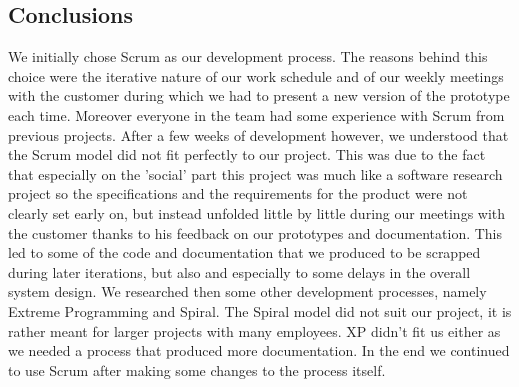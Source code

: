 \subsection{Conclusions}
We initially chose Scrum as our development process. The reasons behind this choice were the iterative nature
of our work schedule and of our weekly meetings with the customer during which we had to present a new version
of the prototype each time. Moreover everyone in the team had some experience with Scrum from previous projects.
After a few weeks of development however, we understood that the Scrum model did not fit perfectly to our project.
This was due to the fact that especially on the 'social' part this project was much like a software research project
so the specifications and the requirements for the product were not clearly set early on, but instead unfolded little
by little during our meetings with the customer thanks to his feedback on our prototypes and documentation.
This led to some of the code and documentation that we produced to be scrapped during later iterations,
but also and especially to some delays in the overall system design. We researched then some other development
processes, namely Extreme Programming and Spiral. The Spiral model did not suit our project, it is rather meant
for larger projects with many employees. XP didn't fit us either as we needed a process that produced more documentation.
In the end we continued to use Scrum after making some changes to the process itself.


